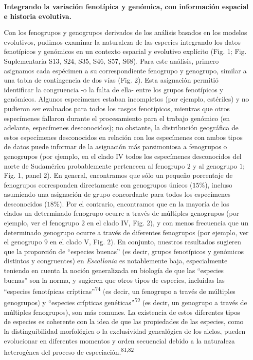 \documentclass[
  11pt,
]{article}
\begin{document}
\textbf{Integrando la variación fenotípica y genómica, con información espacial e historia evolutiva.}

Con los fenogrupos y genogrupos derivados de los análisis basados en los modelos evolutivos, pudimos examinar la naturaleza de las especies integrando los datos fenotípicos y genómicos en un contexto espacial y evolutivo explícito (Fig. 1; Fig. Suplementaria S13, S24, S35, S46, S57, S68). Para este análisis, primero asignamos cada espécimen a su correspondiente fenogrupo y genogrupo, similar a una tabla de contingencia de dos vías (Fig. 2). Esta asignación permitió identificar la congruencia -o la falta de ella- entre los grupos fenotípicos y genómicos. Algunos especímenes estaban incompletos (por ejemplo, estériles) y no pudieron ser evaluados para todos los rasgos fenotípicos, mientras que otros especímenes fallaron durante el procesamiento para el trabajo genómico (en adelante, especímenes desconocidos); no obstante, la distribución geográfica de estos especímenes desconocidos en relación con los especímenes con ambos tipos de datos puede informar de la asignación más parsimoniosa a fenogrupos o genogrupos (por ejemplo, en el clado IV todos los especímenes desconocidos del norte de Sudamérica probablemente pertenecen al fenogrupo \(2\) y al genogrupo \(1\); Fig. 1, panel 2). En general, encontramos que sólo un pequeño porcentaje de fenogrupos corresponden directamente con genogrupos únicos (\(15\%\)), incluso asumiendo una asignación de grupo concordante para todos los especímenes desconocidos (\(18\%\)). Por el contrario, encontramos que en la mayoría de los clados un determinado fenogrupo ocurre a través de múltiples genogrupos (por ejemplo, ver el fenogrupo \(2\) en el clado IV, Fig. 2), y con menos frecuencia que un determinado genogrupo ocurre a través de diferentes fenogrupos (por ejemplo, ver el genogrupo \(9\) en el clado V, Fig. 2). En conjunto, nuestros resultados sugieren que la proporción de ``especies buenas'' (es decir, grupos fenotípicos y genómicos distintos y congruentes) en \emph{Escallonia} es notablemente baja, especialmente teniendo en cuenta la noción generalizada en biología de que las ``especies buenas'' son la norma, y sugieren que otros tipos de especies, incluidas las ``especies fenotípicas crípticas''\textsuperscript{74} (es decir, un fenogrupo a través de múltiples genogrupos) y ``especies crípticas genéticas''\textsuperscript{52} (es decir, un genogrupo a través de múltiples fenogrupos), son más comunes. La existencia de estos diferentes tipos de especies es coherente con la idea de que las propiedades de las especies, como la distinguibilidad morfológica o la exclusividad genealógica de los alelos, pueden evolucionar en diferentes momentos y orden secuencial debido a la naturaleza heterogénea del proceso de especiación.\textsuperscript{81,82}
\end{document}
